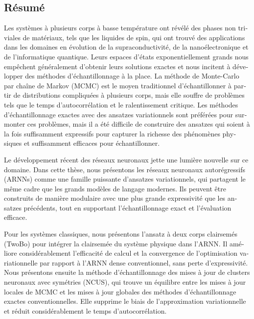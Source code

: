 \begin{otherlanguage}{french}
\cleardoublepage
\chapter*{Résumé}

Les systèmes à plusieurs corps à basse température ont révélé des phases non triviales de matériaux, tels que les liquides de spin, qui ont trouvé des applications dans les domaines en évolution de la supraconductivité, de la nanoélectronique et de l'informatique quantique.
Leurs espaces d'états exponentiellement grands nous empêchent généralement d'obtenir leurs solutions exactes et nous incitent à développer des méthodes d'échantillonnage à la place.
La méthode de Monte-Carlo par chaîne de Markov (MCMC) est le moyen traditionnel d'échantillonner à partir de distributions compliquées à plusieurs corps, mais elle souffre de problèmes tels que le temps d'autocorrélation et le ralentissement critique.
Les méthodes d'échantillonnage exactes avec des ansatzes variationnels sont préférées pour surmonter ces problèmes, mais il a été difficile de construire des ansatzes qui soient à la fois suffisamment expressifs pour capturer la richesse des phénomènes physiques et suffisamment efficaces pour échantillonner.

Le développement récent des réseaux neuronaux jette une lumière nouvelle sur ce domaine.
Dans cette thèse, nous présentons les réseaux neuronaux autorégressifs (ARNNs) comme une famille puissante d'ansatzes variationnels, qui partagent le même cadre que les grands modèles de langage modernes.
Ils peuvent être construits de manière modulaire avec une plus grande expressivité que les ansatzes précédents, tout en supportant l'échantillonnage exact et l'évaluation efficace.

Pour les systèmes classiques, nous présentons l'ansatz à deux corps clairsemés (TwoBo) pour intégrer la clairsemée du système physique dans l'ARNN.
Il améliore considérablement l'efficacité de calcul et la convergence de l'optimisation variationnelle par rapport à l'ARNN dense conventionnel, sans perte d'expressivité.
Nous présentons ensuite la méthode d'échantillonnage des mises à jour de clusters neuronaux avec symétries (NCUS), qui trouve un équilibre entre les mises à jour locales de MCMC et les mises à jour globales des méthodes d'échantillonnage exactes conventionnelles.
Elle supprime le biais de l'approximation variationnelle et réduit considérablement le temps d'autocorrélation.


\end{otherlanguage}
